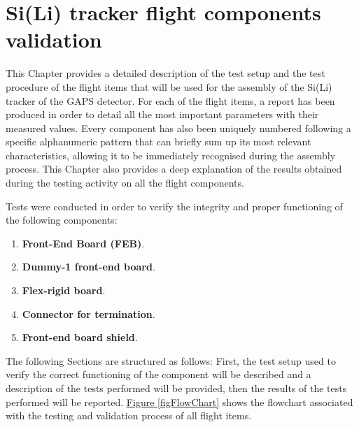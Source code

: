 \chapter[Si(Li) tracker flight components validation]{Si(Li) tracker flight components \\validation} \label{ch2}

This Chapter provides a detailed description of the test setup and the test procedure of the flight items that will be used for the assembly of the Si(Li) tracker of the GAPS detector. For each of the flight items, a report has been produced in order to detail all the most important parameters with their measured values. Every component has also been uniquely numbered following a specific alphanumeric pattern that can briefly sum up its most relevant characteristics, allowing it to be immediately recognised during the assembly process. This Chapter also provides a deep explanation of the results obtained during the testing activity on all the flight components.

\par
Tests were conducted in order to verify the integrity and proper functioning of the following components:

\begin{enumerate}
    \itemsep0em 
    \item \textbf{Front-End Board (FEB)}.
    \item \textbf{Dummy-1 front-end board}.
    \item \textbf{Flex-rigid board}.
    \item \textbf{Connector for termination}.
    \item \textbf{Front-end board shield}.
\end{enumerate}

\par
The following Sections are structured as follows: First, the test setup used to verify the correct functioning of the component will be described and a description of the tests performed will be provided, then the results of the tests performed will be reported. \hyperref[figFlowChart]{Figure \ref{figFlowChart}} shows the flowchart associated with the testing and validation process of all flight items.

